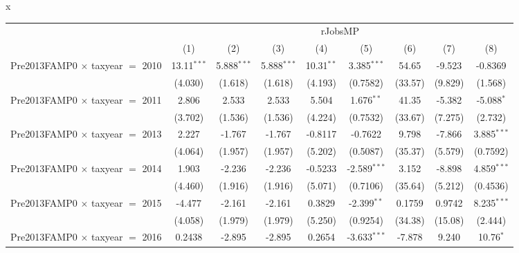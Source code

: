 x
\begingroup
\centering
\begin{tabular}{lcccccccc}
   \toprule
    & \multicolumn{8}{c}{rJobsMP}\\
                                           & (1)           & (2)            & (3)            & (4)           & (5)            & (6)           & (7)           & (8)\\  
   \midrule 
   Pre2013FAMP0 $\times$ taxyear $=$ 2010  & 13.11$^{***}$ & 5.888$^{***}$  & 5.888$^{***}$  & 10.31$^{**}$  & 3.385$^{***}$  & 54.65         & -9.523        & -0.8369\\   
                                           & (4.030)       & (1.618)        & (1.618)        & (4.193)       & (0.7582)       & (33.57)       & (9.829)       & (1.568)\\   
   Pre2013FAMP0 $\times$ taxyear $=$ 2011  & 2.806         & 2.533          & 2.533          & 5.504         & 1.676$^{**}$   & 41.35         & -5.382        & -5.088$^{*}$\\   
                                           & (3.702)       & (1.536)        & (1.536)        & (4.224)       & (0.7532)       & (33.67)       & (7.275)       & (2.732)\\   
   Pre2013FAMP0 $\times$ taxyear $=$ 2013  & 2.227         & -1.767         & -1.767         & -0.8117       & -0.7622        & 9.798         & -7.866        & 3.885$^{***}$\\   
                                           & (4.064)       & (1.957)        & (1.957)        & (5.202)       & (0.5087)       & (35.37)       & (5.579)       & (0.7592)\\   
   Pre2013FAMP0 $\times$ taxyear $=$ 2014  & 1.903         & -2.236         & -2.236         & -0.5233       & -2.589$^{***}$ & 3.152         & -8.898        & 4.859$^{***}$\\   
                                           & (4.460)       & (1.916)        & (1.916)        & (5.071)       & (0.7106)       & (35.64)       & (5.212)       & (0.4536)\\   
   Pre2013FAMP0 $\times$ taxyear $=$ 2015  & -4.477        & -2.161         & -2.161         & 0.3829        & -2.399$^{**}$  & 0.1759        & 0.9742        & 8.235$^{***}$\\   
                                           & (4.058)       & (1.979)        & (1.979)        & (5.250)       & (0.9254)       & (34.38)       & (15.08)       & (2.444)\\   
   Pre2013FAMP0 $\times$ taxyear $=$ 2016  & 0.2438        & -2.895         & -2.895         & 0.2654        & -3.633$^{***}$ & -7.878        & 9.240         & 10.76$^{*}$\\   

\end{tabular}
